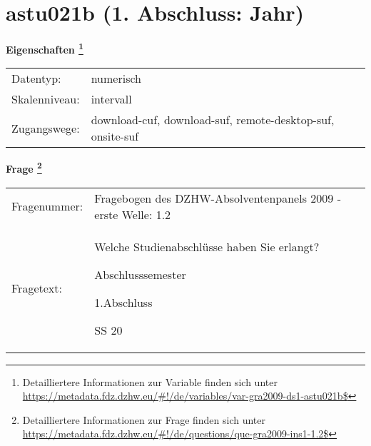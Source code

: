 
    \setcounter{footnote}{0}

    \vspace*{-1.8cm}
	\section{astu021b (1. Abschluss: Jahr)}
	\label{section:astu021b}



    \vspace*{0.5cm}
    \noindent\textbf{Eigenschaften
	\footnote{Detailliertere Informationen zur Variable finden sich unter
		\url{https://metadata.fdz.dzhw.eu/\#!/de/variables/var-gra2009-ds1-astu021b$}}}\\
	\begin{tabularx}{\hsize}{@{}lX}
	Datentyp: & numerisch \\
	Skalenniveau: & intervall \\
	Zugangswege: &
	  download-cuf, 
	  download-suf, 
	  remote-desktop-suf, 
	  onsite-suf
 \\
    \end{tabularx}



				\vspace*{0.5cm}
                \noindent\textbf{Frage
	                \footnote{Detailliertere Informationen zur Frage finden sich unter
		              \url{https://metadata.fdz.dzhw.eu/\#!/de/questions/que-gra2009-ins1-1.2$}}}\\
				\begin{tabularx}{\hsize}{@{}lX}
					Fragenummer: &
					  Fragebogen des DZHW-Absolventenpanels 2009 - erste Welle:
					  1.2
 \\
					Fragetext: & Welche Studienabschlüsse haben Sie erlangt?\par  Abschlusssemester\par  1.Abschluss\par  SS 20 \\
				\end{tabularx}





